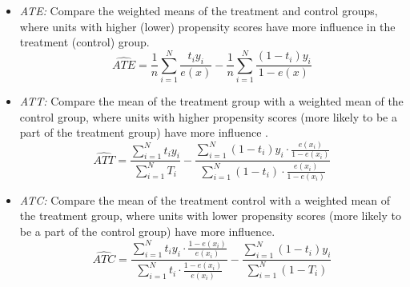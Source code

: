 \documentclass{article}
\newcommand{\gur}[1]{{\color{teal}{Gur: #1}}}
\begin{document}
\begin{itemize}
    \item \textit{ATE:} Compare the weighted means of the treatment and control groups, where units with higher (lower) propensity scores have more influence in the treatment (control) group.
    \[
    \widehat{ATE} = \frac{1}{n}\sum_{i=1}^N \frac{t_i y_i}{e(x)} - \frac{1}{n}\sum_{i=1}^N \frac{(1-t_i)y_i}{1-e(x)}
    \]

    \item \textit{ATT:} Compare the mean of the treatment group with a weighted mean of the control group, where units with higher propensity scores (more likely to be a part of the treatment group) have more influence \citep{lechner2001identification}.
    \[
    \widehat{ATT} = \frac{\sum_{i=1}^N t_i y_i}{\sum_{i=1}^N T_i} - \frac{\sum_{i=1}^N (1-t_i)y_i \cdot \frac{e(x_i)}{1-e(x_i)}}{\sum_{i=1}^N (1-t_i) \cdot \frac{e(x_i)}{1-e(x_i)}}
    \]
    \item \textit{ATC:} Compare the mean of the treatment control with a weighted mean of the treatment group, where units with lower propensity scores (more likely to be a part of the control group) have more influence.
    \[
    \widehat{ATC} = \frac{\sum_{i=1}^N t_iy_i \cdot \frac{1-e(x_i)}{e(x_i)}}{\sum_{i=1}^N t_i \cdot \frac{1-e(x_i)}{e(x_i)}} - \frac{\sum_{i=1}^N (1-t_i)y_i}{\sum_{i=1}^N (1-T_i)}
    \]
\end{itemize}



\end{document}
